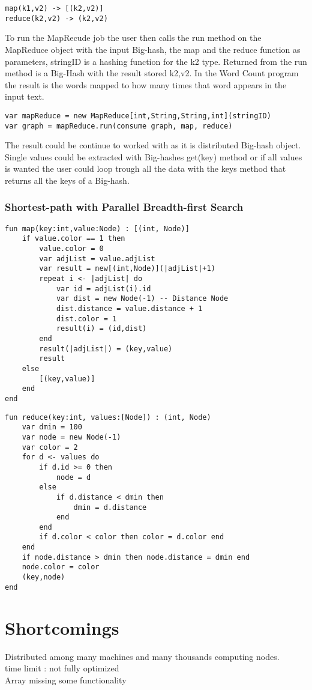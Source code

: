 \begin{lstlisting}
map(k1,v2) -> [(k2,v2)]
reduce(k2,v2) -> (k2,v2)
\end{lstlisting}

To run the MapRecude job the user then calls the run method on the MapReduce object with the input Big-hash, the map and the reduce function as parameters, stringID is a hashing function for the k2 type. Returned from the run method is a Big-Hash with the result stored k2,v2. In the Word Count program the result is the words mapped to how many times that word appears in the input text. 

\begin{lstlisting}
var mapReduce = new MapReduce[int,String,String,int](stringID)
var graph = mapReduce.run(consume graph, map, reduce)
\end{lstlisting}

The result could be continue to worked with as it is distributed Big-hash object. Single values could be extracted with Big-hashes get(key) method or if all values is wanted the user could loop trough all the data with the keys method that returns all the keys of a Big-hash.\\

\subsubsection{Shortest-path with Parallel Breadth-first Search}
\begin{lstlisting}
fun map(key:int,value:Node) : [(int, Node)]
    if value.color == 1 then
        value.color = 0
        var adjList = value.adjList
        var result = new[(int,Node)](|adjList|+1)
        repeat i <- |adjList| do
            var id = adjList(i).id
            var dist = new Node(-1) -- Distance Node
            dist.distance = value.distance + 1
            dist.color = 1
            result(i) = (id,dist)
        end
        result(|adjList|) = (key,value)
        result
    else
        [(key,value)]
    end
end
\end{lstlisting}
\begin{lstlisting}
fun reduce(key:int, values:[Node]) : (int, Node)
    var dmin = 100
    var node = new Node(-1)
    var color = 2
    for d <- values do
        if d.id >= 0 then
            node = d
        else
            if d.distance < dmin then
                dmin = d.distance
            end
        end
        if d.color < color then color = d.color end
    end
    if node.distance > dmin then node.distance = dmin end
    node.color = color
    (key,node)
end
\end{lstlisting}

\section{Shortcomings}
Distributed among many machines and many thousands computing nodes. \\
time limit : not fully optimized \\
Array missing some functionality

